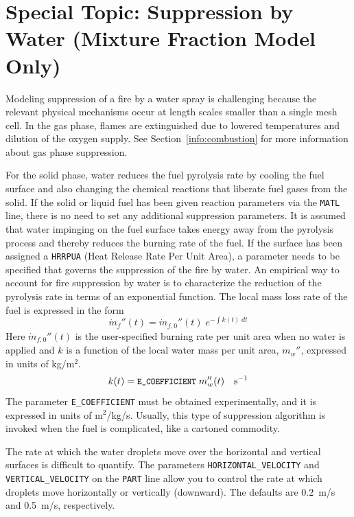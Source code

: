 \documentclass[11pt]{book}
\newcommand{\ct}{\tt\small}
\newcommand{\dm}{\dot{m}}
\newcommand{\be}{\begin{equation}}
\newcommand{\ee}{\end{equation}}
\begin{document}
\section{Special Topic: Suppression by Water (Mixture Fraction Model Only)}
\label{info:suppression}
Modeling suppression of a fire by a water spray is challenging because
the relevant physical mechanisms occur at length scales smaller than a
single mesh cell. In the gas phase, flames are extinguished due to lowered
temperatures and dilution of the oxygen supply. See Section~\ref{info:combustion}
for more information about gas phase suppression.

For the solid phase,
water reduces the fuel pyrolysis rate by cooling the fuel surface and also
changing the chemical reactions that liberate fuel gases from the solid.
If the solid or liquid fuel has been given reaction parameters via the {\ct MATL} line, there is no
need to set any additional suppression parameters. It is assumed that
water impinging on the fuel surface takes energy away from the
pyrolysis process and thereby reduces the burning rate of the fuel.
If the surface has been assigned a {\ct HRRPUA} (Heat Release Rate Per Unit Area),
a parameter needs to be specified that governs the suppression of the fire by water.
An empirical way to account for fire suppression by water
is to characterize the reduction of the pyrolysis rate in terms
of an exponential function. The local mass loss rate of the
fuel is expressed in the form
\be \dm_f''(t) = \dm_{f,0}''(t) \; e^{-\int k(t) \; dt} \label{nistexting} \ee
Here $\dm_{f,0}''(t)$ is the user-specified burning rate per unit
area when no water is applied and $k$ is a function of the local water
mass per unit area, $m_w''$, expressed in units of kg/m$^2$.
\be
k(t) = \hbox{\ct E\_COEFFICIENT} \; m_w''(t) \quad          \hbox{s}^{-1}
\ee
The parameter {\ct E\_COEFFICIENT} must be obtained experimentally, and
it is expressed in units of m$^2$/kg/s. Usually, this type of suppression
algorithm is invoked when the fuel is complicated, like a cartoned commodity.

The rate at which the water droplets move over the horizontal and vertical surfaces is difficult to
quantify. The parameters {\ct HORIZONTAL\_VELOCITY} and {\ct VERTICAL\_VELOCITY} on the {\ct PART} line
allow you to control the rate at which droplets move horizontally or vertically (downward). The defaults are
0.2~m/s and 0.5~m/s, respectively.
\end{document}
